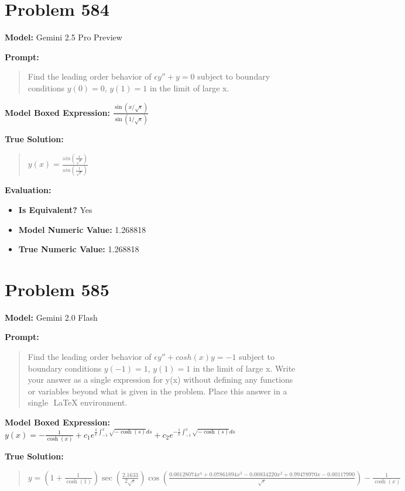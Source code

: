\documentclass{article}
\begin{document}
\section*{Problem 584}
\textbf{Model:} Gemini 2.5 Pro Preview

\textbf{Prompt:}
\begin{quote}
Find the leading order behavior of $\epsilon y'' + y = 0$ subject to boundary conditions $y(0) = 0$, $y(1) = 1$ in the limit of large x.
\end{quote}
\textbf{Model Boxed Expression:} $\frac{\sin(x/\sqrt{\epsilon})}{\sin(1/\sqrt{\epsilon})}$

\textbf{True Solution:}
\begin{quote}
$y(x) = \frac{sin(\frac{x}{\sqrt{\epsilon}})}{sin(\frac{1}{\sqrt{\epsilon}})}$
\end{quote}

\textbf{Evaluation:}
\begin{itemize}
\item \textbf{Is Equivalent?} Yes
\item \textbf{Model Numeric Value:} 1.268818
\item \textbf{True Numeric Value:} 1.268818
\end{itemize}
\vspace{1cm}
\section*{Problem 585}
\textbf{Model:} Gemini 2.0 Flash

\textbf{Prompt:}
\begin{quote}
Find the leading order behavior of $\epsilon y'' + cosh(x)y = -1$ subject to boundary conditions $y(-1) = 1$, $y(1) = 1$ in the limit of large x. Write your answer as a single expression for y(x) without defining any functions or variables beyond what is given in the problem. Place this answer in a single $\boxed{}$ LaTeX environment.
\end{quote}
\textbf{Model Boxed Expression:} $y(x) = -\frac{1}{\cosh(x)} + c_1 e^{\frac{1}{\epsilon}\int_{-1}^x \sqrt{-\cosh(s)} ds} + c_2 e^{-\frac{1}{\epsilon}\int_{-1}^x \sqrt{-\cosh(s)} ds}$

\textbf{True Solution:}
\begin{quote}
$y = (1+\frac{1}{\cosh(1)}) \sec(\frac{2.1633}{2\sqrt{\epsilon}})\cos(\frac{0.00128074x^4 + 0.07861894x^3 - 0.00834220x^2 + 0.99478970x - 0.00117990}{\sqrt{\epsilon}})- \frac{1}{\cosh(x)}$
\end{quote}
\end{document}
